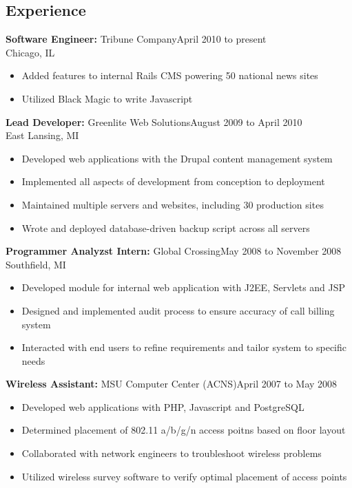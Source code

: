 \documentclass[11pt]{res}
\begin{document}


\begin{resume}


\section{Experience}
{\bf Software Engineer:} Tribune Company\dotfill April 2010 to present\\
Chicago, IL
\begin{itemize}
\item Added features to internal Rails CMS powering 50 national news sites
\item Utilized Black Magic to write Javascript
\end{itemize}

{\bf Lead Developer:} Greenlite Web Solutions\dotfill August 2009 to April 2010\\
East Lansing, MI
\begin{itemize}
\item Developed web applications with the Drupal content management system
\item Implemented all aspects of development from conception to deployment
\item Maintained multiple servers and websites, including 30 production sites
\item Wrote and deployed database-driven backup script across all servers
\end{itemize}

{\bf Programmer Analyzst Intern:} Global Crossing\dotfill May 2008 to November 2008\\
Southfield, MI
\begin{itemize}
\item Developed module for internal web application with J2EE, Servlets and JSP
\item Designed and implemented audit process to ensure accuracy of call billing system
\item Interacted with end users to refine requirements and tailor system to specific needs
\end{itemize}

{\bf Wireless Assistant:} MSU Computer Center (ACNS)\dotfill April 2007 to May 2008
\begin{itemize}
\item Developed web applications with PHP, Javascript and PostgreSQL
\item Determined placement of 802.11 a/b/g/n access poitns based on floor layout
\item Collaborated with network engineers to troubleshoot wireless problems
\item Utilized wireless survey software to verify optimal placement of access points
\end{itemize}



\end{resume}
\end{document}
